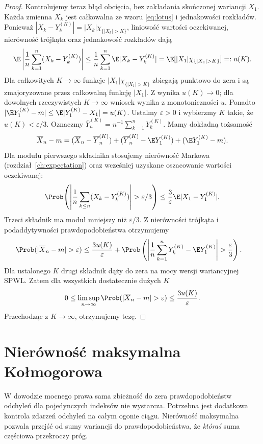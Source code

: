 \begin{proof}
Kontrolujemy teraz błąd obcięcia, bez zakładania
skończonej wariancji $X_1$. Każda zmienna $X_k$ jest
całkowalna ze wzoru \eqref{eq:lotus} i jednakowości
rozkładów. Ponieważ
$|X_k-Y_k^{(K)}|=|X_k|\chi_{\{|X_k|>K\}}$,
liniowość wartości oczekiwanej, nierówność trójkąta
oraz jednakowość rozkładów dają
\[
\E\left|\frac1n\sum_{k=1}^n(X_k-Y_k^{(K)})\right|
\leq\frac1n\sum_{k=1}^n\E|X_k-Y_k^{(K)}|
=\E[|X_1|\chi_{\{|X_1|>K\}}]=:u(K).
\]
Dla całkowitych $K\to\infty$ funkcje
$|X_1|\chi_{\{|X_1|>K\}}$ zbiegają punktowo do zera
i są zmajoryzowane przez całkowalną funkcję $|X_1|$.
Z 
wynika $u(K)\to0$; dla dowolnych rzeczywistych $K\to\infty$
wniosek wynika z monotoniczności $u$.
Ponadto
$|\E Y_1^{(K)}-m|\leq\E|Y_1^{(K)}-X_1|=u(K)$.
Ustalmy $\varepsilon>0$ i wybierzmy $K$ takie,
że $u(K)<\varepsilon/3$.
Oznaczmy $\overline Y_n^{(K)}=n^{-1}\sum_{k=1}^nY_k^{(K)}$.
Mamy dokładną tożsamość
\[
\overline X_n-m
=(\overline X_n-\overline Y_n^{(K)})
+(\overline Y_n^{(K)}-\E Y_1^{(K)})
+(\E Y_1^{(K)}-m).
\]
Dla modułu pierwszego składnika stosujemy
nierówność Markowa (rozdział~\ref{ch:expectation})
oraz wcześniej uzyskane oszacowanie wartości oczekiwanej:
\[
\Prob\!\left(\left|\frac1n\sum_{k\leq n}
(X_k-Y_k^{(K)})\right|>\varepsilon/3\right)
\leq\frac3\varepsilon\E|X_1-Y_1^{(K)}|.
\]
Trzeci składnik ma moduł mniejszy niż $\varepsilon/3$.
Z nierówności trójkąta i podaddytywności prawdopodobieństwa
otrzymujemy
\[
\begin{aligned}
\Prob(|\overline X_n-m|>\varepsilon)
&\leq\frac{3u(K)}{\varepsilon}
+\Prob\left(\left|\frac1n\sum_{k=1}^nY_k^{(K)}
-\E Y_1^{(K)}\right|>\frac{\varepsilon}{3}\right).
\end{aligned}
\]
Dla ustalonego $K$ drugi składnik dąży do zera
na mocy wersji wariancyjnej SPWL.
Zatem dla wszystkich dostatecznie dużych $K$
\[
0\leq\limsup_{n\to\infty}
\Prob(|\overline X_n-m|>\varepsilon)
\leq\frac{3u(K)}{\varepsilon}.
\]
Przechodząc z $K\to\infty$, otrzymujemy tezę.
\end{proof}

\section{Nierówność maksymalna Kołmogorowa}

W dowodzie mocnego prawa sama zbieżność do zera
prawdopodobieństw odchyleń dla pojedynczych indeksów
nie wystarcza. Potrzebna jest dodatkowa kontrola
zdarzeń odchyleń na całym ogonie ciągu.
Nierówność maksymalna pozwala przejść od sumy wariancji
do prawdopodobieństwa, że \emph{któraś} suma częściowa
przekroczy próg.

